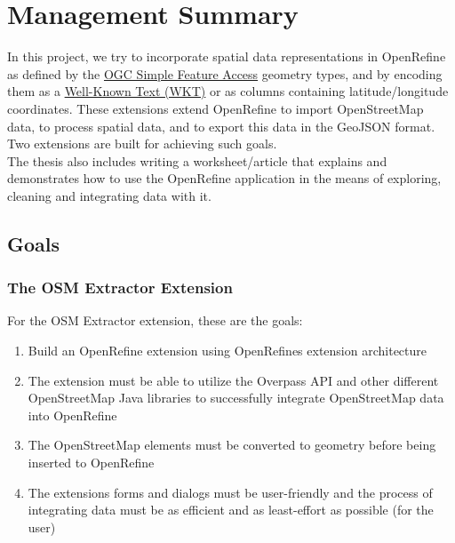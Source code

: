 \chapter*{Management Summary}
In this project, we try to incorporate spatial data representations in OpenRefine as defined by the \href{https://www.ogc.org/standards/sfa}{OGC Simple Feature Access} geometry types, and by encoding them as a \href{https://www.ogc.org/standards/wkt-crs}{Well-Known Text (WKT)} or as columns containing latitude/longitude coordinates. These extensions extend OpenRefine to import OpenStreetMap data, to process spatial data, and to export this data in the GeoJSON format.
Two extensions are built for achieving such goals.\\
\newline
The thesis also includes writing a worksheet/article that explains and demonstrates how to use the OpenRefine application in the means of exploring, cleaning and integrating data with it.
\section*{Goals}
\subsection*{The OSM Extractor Extension}
For the OSM Extractor extension, these are the goals:
\begin{enumerate}
    \item Build an OpenRefine extension using OpenRefine\textquotesingle s extension architecture
    \item The extension must be able to utilize the Overpass API and other different OpenStreetMap Java libraries to successfully
    integrate OpenStreetMap data into OpenRefine
    \item The OpenStreetMap elements must be converted to  geometry before being inserted to OpenRefine
    \item The extension\textquotesingle s forms and dialogs must be user-friendly and the process of integrating data must be as efficient
    and as least-effort as possible (for the user)
\end{enumerate}
